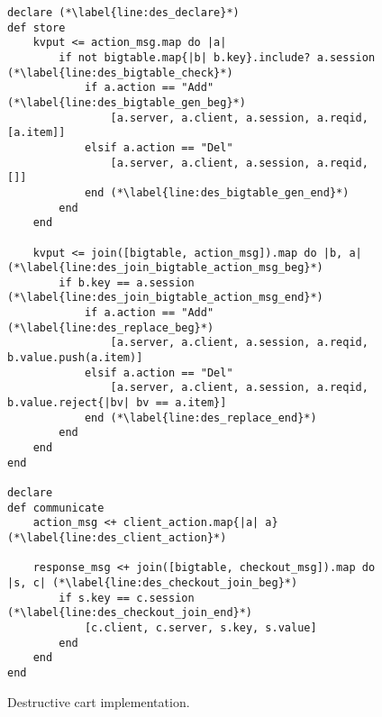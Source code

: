 \begin{comment}
\jmh{Alternative to lines 5--9 is to insert the following rule.  It ``preserves'' the action items that have adds but no deletes ... i.e. the other branch of the left-outer-join.  I think this is easier to explain.}  \jmh{regardless of what you decide, be sure to explain all lines of the program!}
\begin{scriptsize}
\begin{verbatim}
	status <= join(action_cnt, checkout).map do |a, c|
	  if a.action == "Add" and not
	        action_cnt.map{|d| d.id if d.action == "Del" and a.id}.include? a.id
	     [a.session, a.item, a.cnt]
	  end
	end
\end{verbatim}	
\end{scriptsize}
\end{comment}

\begin{figure}[t]
\begin{scriptsize}
\begin{lstlisting}
declare (*\label{line:des_declare}*)
def store
	kvput <= action_msg.map do |a|
		if not bigtable.map{|b| b.key}.include? a.session (*\label{line:des_bigtable_check}*)
			if a.action == "Add" (*\label{line:des_bigtable_gen_beg}*)
				[a.server, a.client, a.session, a.reqid, [a.item]]
			elsif a.action == "Del"
				[a.server, a.client, a.session, a.reqid, []]
			end (*\label{line:des_bigtable_gen_end}*)
		end
	end  

	kvput <= join([bigtable, action_msg]).map do |b, a| (*\label{line:des_join_bigtable_action_msg_beg}*)
		if b.key == a.session (*\label{line:des_join_bigtable_action_msg_end}*)
			if a.action == "Add" (*\label{line:des_replace_beg}*)
				[a.server, a.client, a.session, a.reqid, b.value.push(a.item)]
			elsif a.action == "Del"
				[a.server, a.client, a.session, a.reqid, b.value.reject{|bv| bv == a.item}]
			end (*\label{line:des_replace_end}*)
		end
	end
end

declare
def communicate
	action_msg <+ client_action.map{|a| a} (*\label{line:des_client_action}*)

	response_msg <+ join([bigtable, checkout_msg]).map do |s, c| (*\label{line:des_checkout_join_beg}*)
		if s.key == c.session (*\label{line:des_checkout_join_end}*)
			[c.client, c.server, s.key, s.value]
		end
	end
end
\end{lstlisting}
\vspace{-10pt}
\caption{Destructive cart implementation.}
\label{fig:pdg-destructive}
\vspace{-2pt}
\end{scriptsize}
\end{figure}
